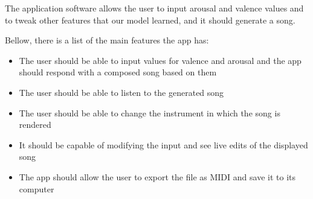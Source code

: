 The application software allows the user to
input arousal and valence values and to tweak other
features that our model learned, and it should generate a song.

Bellow, there is a list of the main features the app has:
\begin{itemize}[]
      \item
            The user should be able to input values for valence and arousal and the app should respond with a composed song based on them
      \item
            The user should be able to listen to the generated song
      \item
            The user should be able to change the instrument in which the song is rendered
      \item
            It should be capable of modifying the input and see live edits of the displayed song
      \item
            The app should allow the user to export the file as MIDI and save it to its computer
\end{itemize}




